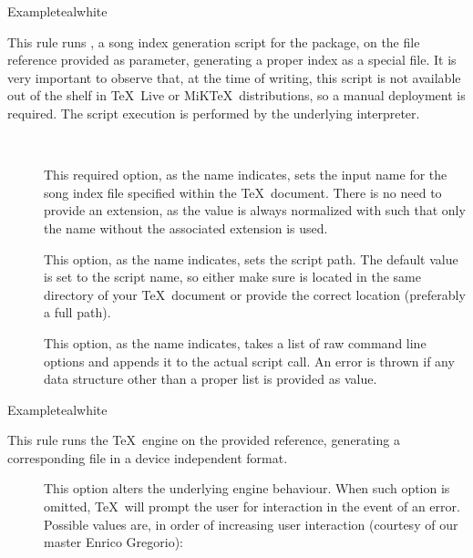 \begin{description}
\begin{codebox}{Example}{teal}{\icnote}{white}
\end{codebox}

\item[\rulebox{songidx}{Francesco Endrici, Paulo Cereda}] This rule runs , a song index generation script for the  package, on the file reference provided as parameter, generating a proper index as a special  file. It is very important to observe that, at the time of writing, this script is not available out of the shelf in \TeX\ Live or MiK\TeX\ distributions, so a manual deployment is required. The script execution is performed by the underlying  interpreter.

\begin{description}
\item[~\rqbox] This required option, as the name indicates, sets the input name for the song index file specified within the \TeX\ document. There is no need to provide an extension, as the value is always normalized with  such that only the name without the associated extension is used.

\item[] This option, as the name indicates, sets the script path. The default value is set to the script name, so either make sure  is located in the same directory of your \TeX\ document or provide the correct location (preferably a full path).

\item[] This option, as the name indicates, takes a list of raw command line options and appends it to the actual script call. An error is thrown if any data structure other than a proper list is provided as value.
\end{description}

\begin{codebox}{Example}{teal}{\icnote}{white}
\end{codebox}


\item[\rulebox{tex}{Marco Daniel, Paulo Cereda}] This rule runs the  \TeX\ engine on the provided  reference, generating a corresponding file in a device independent format.

\begin{description}
\item[] This option alters the underlying engine behaviour. When such option is omitted, \TeX\ will prompt the user for interaction in the event of an error. Possible values are, in order of increasing user interaction (courtesy of our master Enrico Gregorio):


\end{description}
\end{description}
